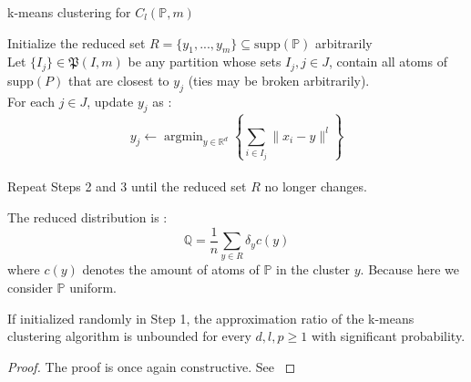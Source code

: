\documentclass{amsart}
\newcommand{\argmin}{\mathop{\arg\min}}
\newcommand{\RR}{\mathbb{R}}
\begin{document}
\begin{algorithm}
    \caption{k-means clustering for $C_l\left(\mathbb{P},m\right)$}\label{k m}
    Initialize the reduced set $R=\{y_1,...,y_m\} \subseteq \text{supp}\left(\mathbb{P}\right)$ arbitrarily \\ Let $\{I_j\}\in\mathfrak{P}\left(I,m\right)$ be any partition whose sets $I_j, j\in J$, contain all atoms of supp$\left(P\right)$ that are closest to $y_j$ (ties may be broken arbitrarily). \\ For each $j\in J$, update $y_j$ as : $$y_j \gets \argmin_{y\in\RR^d} \left\{ \sum_{i\in I_j}\lVert x_i-y\rVert^l\right\}$$ \\ Repeat Steps 2 and 3 until the reduced set $R$ no longer changes.
\end{algorithm}
The reduced distribution is :
$$
\mathbb{Q}=\frac{1}{n}\sum_{y\in R}\delta_{y}c\left(y\right)
$$
where $ c\left(y\right)$ denotes the amount of atoms of $\mathbb{P}$ in the cluster $y$. Because here we consider $\mathbb{P}$ uniform.
\begin{theorem}
    If initialized randomly in Step 1, the approximation ratio of the k-means clustering algorithm is unbounded for every $d,l,p\geq1$ with significant probability.
\end{theorem}
\begin{proof}
    The proof is once again constructive. See \cite[Theorem 8]{rujeerapaiboon_scenario_2022}
\end{proof}
\end{document}
